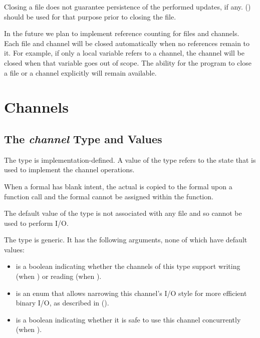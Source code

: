 Closing a file does not guarantee persistence of the
performed updates, if any.
 () should be used for that purpose
prior to closing the file.

\begin{future}
In the future we plan to implement reference counting for files
and channels. Each file and channel will be closed automatically
when no references remain to it. For example, if only a local
variable refers to a channel, the channel will be closed
when that variable goes out of scope.
The ability for the program to close a file or a channel
explicitly will remain available.
\end{future}


\section{Channels}
\label{IO_channels}


\subsection{The {\em channel} Type and Values}
\label{IO_channel_type}

The  type is implementation-defined.
A value of the  type refers to the state that is used
to implement the channel operations.

When a  formal has blank intent, the
actual is copied to the formal upon a function call and
the formal cannot be assigned within the function.

The default value of the  type is not associated
with any file and so cannot be used to perform I/O.

The  type is generic. It has the following arguments,
none of which have default values:

\begin{itemize}

\item {} is a boolean indicating whether the channels of this type
      support writing (when ) or reading (when ).

\item {} is an enum  that allows narrowing
      this channel's I/O style for more efficient binary I/O,
      as described in ().

\item {} is a boolean indicating whether it is
      safe to use this channel concurrently (when ).

\end{itemize}



